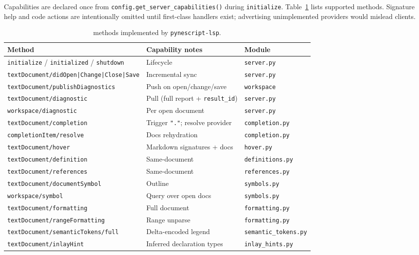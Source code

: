 \documentclass[11pt,a4paper]{article}
\begin{document}
Capabilities are declared once from \texttt{config.get\_server\_capabilities()} during
\texttt{initialize}. Table~\ref{tab:methods} lists supported methods. Signature help and
code actions are intentionally omitted until first-class handlers exist; advertising
unimplemented providers would mislead clients.

\begin{table}[t]
\centering
\caption{\lsp{} methods implemented by \texttt{pynescript-lsp}.}
\label{tab:methods}
\small
\begin{tabular}{@{}lll@{}}
\toprule
Method & Capability notes & Module \\
\midrule
\texttt{initialize} / \texttt{initialized} / \texttt{shutdown} & Lifecycle & \texttt{server.py} \\
\texttt{textDocument/didOpen|Change|Close|Save} & Incremental sync & \texttt{server.py} \\
\texttt{textDocument/publishDiagnostics} & Push on open/change/save & \texttt{workspace} \\
\texttt{textDocument/diagnostic} & Pull (full report + \texttt{result\_id}) & \texttt{server.py} \\
\texttt{workspace/diagnostic} & Per open document & \texttt{server.py} \\
\texttt{textDocument/completion} & Trigger \texttt{"."}; resolve provider & \texttt{completion.py} \\
\texttt{completionItem/resolve} & Docs rehydration & \texttt{completion.py} \\
\texttt{textDocument/hover} & Markdown signatures + docs & \texttt{hover.py} \\
\texttt{textDocument/definition} & Same-document & \texttt{definitions.py} \\
\texttt{textDocument/references} & Same-document & \texttt{references.py} \\
\texttt{textDocument/documentSymbol} & Outline & \texttt{symbols.py} \\
\texttt{workspace/symbol} & Query over open docs & \texttt{symbols.py} \\
\texttt{textDocument/formatting} & Full document & \texttt{formatting.py} \\
\texttt{textDocument/rangeFormatting} & Range unparse & \texttt{formatting.py} \\
\texttt{textDocument/semanticTokens/full} & Delta-encoded legend & \texttt{semantic\_tokens.py} \\
\texttt{textDocument/inlayHint} & Inferred declaration types & \texttt{inlay\_hints.py} \\
\bottomrule
\end{tabular}
\end{table}
\end{document}
